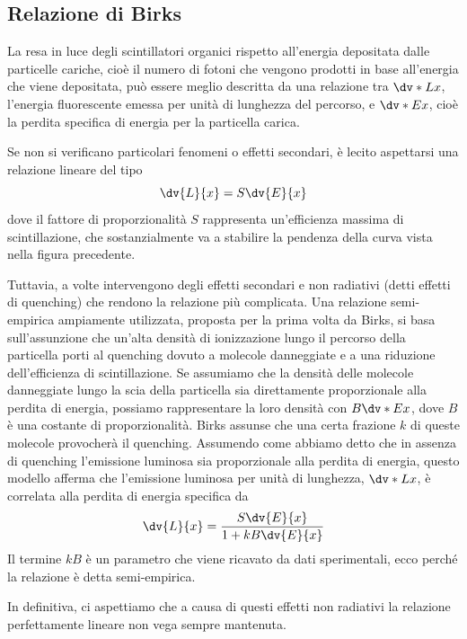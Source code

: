 \subsection{Relazione di Birks}
La resa in luce degli scintillatori organici rispetto all'energia depositata dalle particelle cariche, cioè il numero di fotoni che vengono prodotti in base all'energia che viene depositata, può essere meglio descritta da una relazione tra $\dv*{L}{x}$, l'energia fluorescente emessa per unità di lunghezza del percorso, e $\dv*{E}{x}$, cioè la perdita specifica di energia per la particella carica.

Se non si verificano particolari fenomeni o effetti secondari, è lecito aspettarsi una relazione lineare del tipo
\begin{equation*}
   \dv{L}{x}=S\dv{E}{x}
\end{equation*}
dove il fattore di proporzionalità $S$ rappresenta un'efficienza massima di scintillazione, che sostanzialmente va a stabilire la pendenza della curva vista nella figura precedente.

Tuttavia, a volte intervengono degli effetti secondari e non radiativi (detti effetti di quenching) che rendono la relazione più complicata. Una relazione semi-empirica ampiamente utilizzata, proposta per la prima volta da Birks, si basa sull'assunzione che un'alta densità di ionizzazione lungo il percorso della particella porti al quenching dovuto a molecole danneggiate e a una riduzione dell'efficienza di scintillazione. Se assumiamo che la densità delle molecole danneggiate lungo la scia della particella sia direttamente proporzionale alla perdita di energia, possiamo rappresentare la loro densità con $B\dv*{E}{x}$, dove $B$ è una costante di proporzionalità. Birks assunse che una certa frazione $k$ di queste molecole provocherà il quenching. Assumendo come abbiamo detto che in assenza di quenching l'emissione luminosa sia proporzionale alla perdita di energia, questo modello afferma che l'emissione luminosa per unità di lunghezza, $\dv*{L}{x}$, è correlata alla perdita di energia specifica da
\begin{equation*}
   \dv{L}{x}=\frac{\displaystyle S\dv{E}{x}}{\displaystyle 1 + kB \dv{E}{x}}
\end{equation*}
Il termine $kB$ è un parametro che viene ricavato da dati sperimentali, ecco perché la relazione è detta semi-empirica.

In definitiva, ci aspettiamo che a causa di questi effetti non radiativi la relazione perfettamente lineare non vega sempre mantenuta.

